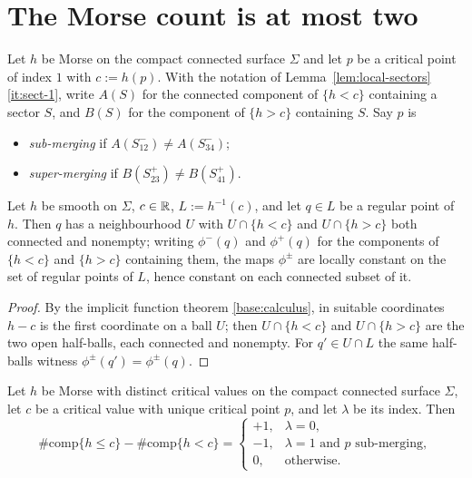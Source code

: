 \section{The Morse count is at most two}\label{sec:morse-count}

\begin{definition}\label{def:merging-saddle}
Let $h$ be Morse on the compact connected surface $\Sigma$ and let $p$ be a
critical point of index $1$ with $c:=h(p)$.  With the notation of
Lemma~\ref{lem:local-sectors}\ref{it:sect-1}, write $A(S)$ for the connected
component of $\{h<c\}$ containing a sector $S$, and $B(S)$ for the component
of $\{h>c\}$ containing $S$.  Say $p$ is
\begin{itemize}[nosep]
\item \emph{sub-merging} if $A(S^-_{12})\ne A(S^-_{34})$;
\item \emph{super-merging} if $B(S^+_{23})\ne B(S^+_{41})$.
\end{itemize}
\end{definition}

\begin{lemma}
\label{lem:level-adjacency}
Let $h$ be smooth on $\Sigma$, $c\in\mathbb R$, $L:=h^{-1}(c)$, and let $q\in L$ be a
regular point of $h$.  Then $q$ has a neighbourhood $U$ with
$U\cap\{h<c\}$ and $U\cap\{h>c\}$ both connected and nonempty; writing
$\phi^-(q)$ and $\phi^+(q)$ for the components of $\{h<c\}$ and $\{h>c\}$
containing them, the maps $\phi^\pm$ are locally constant on the set of
regular points of $L$, hence constant on each connected subset of it.
\end{lemma}

\begin{proof}
By the implicit function theorem \ref{base:calculus}, in suitable coordinates
$h-c$ is the first coordinate on a ball $U$; then $U\cap\{h<c\}$ and
$U\cap\{h>c\}$ are the two open half-balls, each connected and nonempty.  For
$q'\in U\cap L$ the same half-balls witness
$\phi^\pm(q')=\phi^\pm(q)$.
\end{proof}

\begin{lemma}\label{lem:sublevel-closure}
Let $h$ be Morse with distinct critical values on the compact connected
surface $\Sigma$, let $c$ be a critical value with unique critical point $p$,
and let $\lambda$ be its index.  Then
\[
  \#\mathrm{comp}\{h\le c\}-\#\mathrm{comp}\{h<c\}
  =\begin{cases}
    +1,&\lambda=0,\\
    -1,&\lambda=1\text{ and }p\text{ sub-merging},\\
    0,&\text{otherwise}.
  \end{cases}
\]
\end{lemma}

